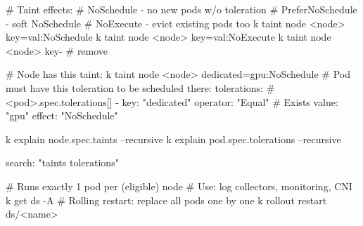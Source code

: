 \begin{tcbitemize}[
  raster columns=4, raster equal height=rows,
  blanker, cheat subtitle
]

  \tcbitem
    \begin{tcbitemize}[
      raster columns=1, raster equal height=rows,
      blanker, cheat subtitle
    ]

      \tcbitem
        \begin{cheatcodebash}
        # Taint effects:
        # NoSchedule        - no new pods w/o toleration
        # PreferNoSchedule  - soft NoSchedule
        # NoExecute         - evict existing pods too
        k taint node <node> key=val:NoSchedule
        k taint node <node> key=val:NoExecute
        k taint node <node> key-       # remove
        \end{cheatcodebash}

        \begin{cheatcodebash}
          # Node has this taint:
          k taint node <node> dedicated=gpu:NoSchedule
          # Pod must have this toleration to be scheduled there:
          tolerations:           # <pod>.spec.tolerations[]
          - key: "dedicated"
            operator: "Equal"    # Exists
            value: "gpu"
            effect: "NoSchedule"
        \end{cheatcodebash}

        \begin{cheatcodebash}
        k explain node.spec.taints --recursive
        k explain pod.spec.tolerations --recursive
        \end{cheatcodebash}

        \begin{cheatcodebash}
        search: "taints tolerations"
        \end{cheatcodebash}

      \tcbitem

        \begin{cheatcodebash}
        # Runs exactly 1 pod per (eligible) node
        # Use: log collectors, monitoring, CNI
        k get ds -A
        # Rolling restart: replace all pods one by one
        k rollout restart ds/<name>
        \end{cheatcodebash}


\end{tcbitemize}
\end{tcbitemize}
